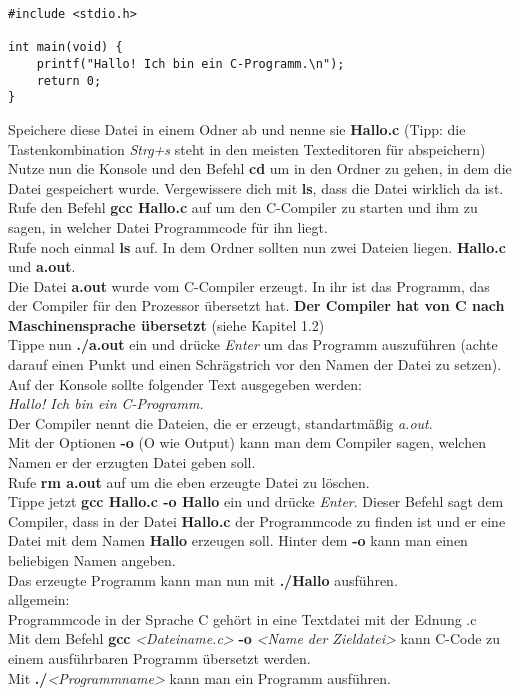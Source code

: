 \documentclass[c_worksheet.tex]{subfiles}
\begin{document}
\begin{lstlisting}
#include <stdio.h>

int main(void) {
    printf("Hallo! Ich bin ein C-Programm.\n");
    return 0;
}
\end{lstlisting}

Speichere diese Datei in einem Odner ab und nenne sie \textbf{Hallo.c} (Tipp: die Tastenkombination \textit{Strg+s} steht in den meisten Texteditoren für abspeichern)\\
Nutze nun die Konsole und den Befehl \textbf{cd} um in den Ordner zu gehen, in dem die Datei gespeichert wurde. Vergewissere dich mit \textbf{ls}, dass die Datei wirklich da ist.\\
Rufe den Befehl \textbf{gcc Hallo.c} auf um den C-Compiler zu starten und ihm zu sagen, in welcher Datei Programmcode für ihn liegt.\\
Rufe noch einmal \textbf{ls} auf. In dem Ordner sollten nun zwei Dateien liegen. \textbf{Hallo.c} und \textbf{a.out}.\\
Die Datei \textbf{a.out} wurde vom C-Compiler erzeugt. In ihr ist das Programm, das der Compiler für den Prozessor übersetzt hat.
\textbf{Der Compiler hat von C nach Maschinensprache übersetzt} (siehe Kapitel 1.2) \\
Tippe nun \textbf{./a.out} ein und drücke \textit{Enter} um das Programm auszuführen (achte darauf einen Punkt und einen Schrägstrich vor den Namen der Datei zu setzen). Auf der Konsole sollte folgender Text ausgegeben werden:\\

\textit{Hallo! Ich bin ein C-Programm.}\\

Der Compiler nennt die Dateien, die er erzeugt, standartmäßig \textit{a.out}.\\
Mit der Optionen \textbf{-o} (O wie Output) kann man dem Compiler sagen, welchen Namen er der erzugten Datei geben soll.\\
Rufe \textbf{rm a.out} auf um die eben erzeugte Datei zu löschen.\\
Tippe jetzt \textbf{gcc Hallo.c -o Hallo} ein und drücke \textit{Enter}. Dieser Befehl sagt dem Compiler, dass in der Datei \textbf{Hallo.c} der Programmcode zu finden ist und er eine Datei mit dem Namen \textbf{Hallo} erzeugen soll. Hinter dem \textbf{-o} kann man einen beliebigen Namen angeben.\\
Das erzeugte Programm kann man nun mit \textbf{./Hallo} ausführen.\\

allgemein:\\
Programmcode in der Sprache C gehört in eine Textdatei mit der Ednung .c\\
Mit dem Befehl \textbf{gcc} \textit{<Dateiname.c>} \textbf{-o} \textit{<Name der Zieldatei>} kann C-Code zu einem ausführbaren Programm übersetzt werden.\\
Mit \textbf{./}\textit{<Programmname>} kann man ein Programm ausführen.
\end{document}
